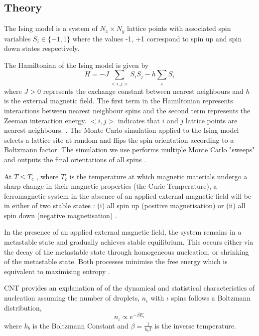 \documentclass{article}
\begin{document}
\begin{multicols*}{2}
\maketitle

\section{Theory}


The Ising model is a system of $N_{x} {\times } N_{y}$ lattice points with associated spin variables $ S_{i} \in \{-1, 1\}$ where the values -1, +1 correspond to spin up and spin down states respectively.

The Hamiltonian of the Ising model is given by 
\begin{equation}\label{Hamiltonian}
H = -J\sum_{<i,j>}S_{i}S_{j} - h\sum_{i}S_{i}
\end{equation}
where $J > 0$ represents the exchange constant between nearest neighbours and $h$ is the external magnetic field. The first term in the Hamiltonian represents interactions between nearest neighbour spins and the second term represents the Zeeman interaction energy. $<i,j>$ indicates that $i$ and $j$ lattice points are nearest neighbours. \cite{polin}. The Monte Carlo simulation applied to the Ising model selects a lattice site at random and flips the spin orientation according to a Boltzmann factor. The simulation we use performs multiple Monte Carlo "sweeps" and outputs the final orientations of all spins \cite{SSS}.

At $T \leq T_{c}$ , where $T_{c}$ is the temperature at which magnetic materials undergo a sharp change in their magnetic properties (the Curie Temperature), a ferromagnetic system in the absence of an applied external magnetic field will be in either of two stable states : (i) all spin up (positive magnetisation) or (ii) all spin down (negative magnetisation) \cite{naskar_fields}.

In the presence of an applied external magnetic field, the system remains in a metastable state and gradually achieves stable equilibrium. This occurs either via the decay of the metastable state through homogeneous nucleation, or shrinking of the metastable state. Both processes minimise the free energy which is equivalent to maximising entropy \cite{polin}.

CNT provides an explanation of of the dynamical and statistical characteristics of nucleation assuming the number of droplets, $n_{\iota}$ with $\iota$ spins follows a Boltzmann distribution,
\begin{equation}\label{Boltzmann}
n_{\iota} \propto e^{-\beta E_{\iota}}
\end{equation}
where $k_{b}$ is the Boltzmann Constant and $\beta = \frac{1}{k_{b}T}$ is the inverse temperature.


\end{multicols*}
\end{document}
